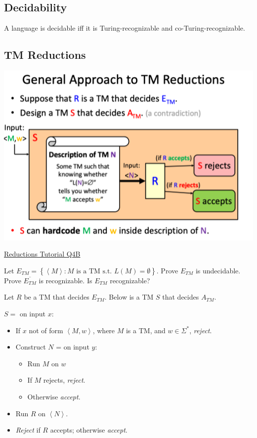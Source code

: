 \documentclass[10pt,landscape,a4paper]{article}
\newcommand{\set}[1]{\left \{ #1 \right \}}
\newcommand{\encoding}[1]{\left \langle #1 \right \rangle}
\begin{document}
\begin{multicols*}{3}
\subsection{Decidability}

A language is decidable iff it is Turing-recognizable and co-Turing-recognizable.

\subsection{TM Reductions}

\includegraphics[scale=0.5]{general_approach_to_tm_reductions}

\underline{Reductions Tutorial Q4B}

Let $E_{TM} = \set{\encoding{M}: M \text{ is a TM s.t. } L(M) = \emptyset}$. Prove $E_{TM}$ is undecidable. Prove $\overline{E_{TM}}$ is recognizable. Is $E_{TM}$ recognizable?

Let $R$ be a TM that decides $E_{TM}$. Below is a TM $S$ that decides $A_{TM}$.

$S = $ on input $x$:

\begin{itemize}
    \item If $x$ not of form $\encoding{M, w}$, where $M$ is a TM, and $w \in \Sigma^*$, \emph{reject}.
    \item Construct $N$ = on input $y$:
    \begin{itemize}
        \item Run $M$ on $w$
        \item If $M$ rejects, \emph{reject}.
        \item Otherwise \emph{accept}.
    \end{itemize}
    \item Run $R$ on $\encoding{N}$.
    \item \emph{Reject} if $R$ accepts; otherwise \emph{accept}.
\end{itemize}


\end{multicols*}
\end{document}
